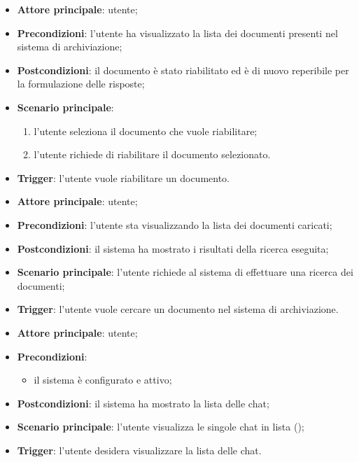 \documentclass[10pt, a4paper]{article}
\begin{document}
    \begin{itemize}
        \item \textbf{Attore principale}: utente;
        \item \textbf{Precondizioni}: l’utente ha visualizzato la lista dei documenti presenti nel sistema di archiviazione;
        \item \textbf{Postcondizioni}: il documento è stato riabilitato ed è di nuovo reperibile per la formulazione delle risposte;
        \item \textbf{Scenario principale}:
            \begin{enumerate}
                \item l’utente seleziona il documento che vuole riabilitare;
                \item l’utente richiede di riabilitare il documento selezionato.
            \end{enumerate}
        \item \textbf{Trigger}: l’utente vuole riabilitare un documento.
    \end{itemize}

    \begin{itemize}
        \item \textbf{Attore principale}: utente;
        \item \textbf{Precondizioni}: l’utente sta visualizzando la lista dei documenti caricati;
        \item \textbf{Postcondizioni}: il sistema ha mostrato i risultati della ricerca eseguita;
        \item \textbf{Scenario principale}: l’utente richiede al sistema di effettuare una ricerca dei documenti;
        \item \textbf{Trigger}: l’utente vuole cercare un documento nel sistema di archiviazione.
    \end{itemize}
    

    \begin{itemize}
        \item \textbf{Attore principale}: utente;
        \item \textbf{Precondizioni}:
        \begin{itemize}
            \item il sistema è configurato e attivo;
        \end{itemize}
        \item \textbf{Postcondizioni}: il sistema ha mostrato la lista delle chat;
        \item \textbf{Scenario principale}: l'utente visualizza le singole chat in lista ();
        \item \textbf{Trigger}: l’utente desidera visualizzare la lista delle chat.
    \end{itemize}
\end{document}
